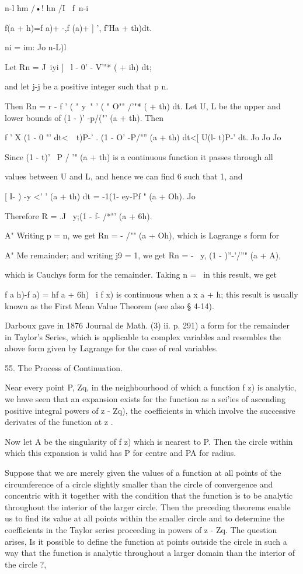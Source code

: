 {{n-l hm /•! hn /I \ f\ n-i

f(a + h)=f a)+ -,f (a)+ ] ', f'Ha + th)dt.

ni = im: Jo n-L)l

Let Rn = J~iyi ] \ l - 0' - V'"* ( + ih) dt;

and let j-j be a positive integer such that p n.

%
%

Then Rn = r - f ' ( " y~" ' ( " O"" /'"* ( + th) dt. Let U, L be the
upper and lower bounds of (1 - )' -p/("' (a + th). Then

f ' X (1 - 0 "' dt<\ \ t)P-' . (1 - O' -P/"'' (a + th) dt<[ U(l- t)P-'
dt. Jo Jo Jo

Since (1 - t)' ~P / '" (a + th) is a continuous function it passes
through all

values between U and L, and hence we can find 6 such that 1, and

[ I- ) -y <' ' (a + th) dt = -1(1- ey-Pf " (a + Oh). Jo

Therefore R = .J \ y;(1 - f- /*"' (a + 6h).

A" Writing p = n, we get Rn = - /"" (a + Oh), which is Lagrange s form
for

A" Me remainder; and writing j9 = 1, we get Rn = - \, y, (1 -
)''-'/''" (a + A),

which is Cauchys form for the remainder. Taking n = \ in this result,
we get

f a h)-f a) = hf a + 6h) \ i f x) is continuous when a x a + h; this
result is usually known as the First Mean Value Theorem (see also §
4-14).

Darboux gave in 1876 Journal de Math. (3) ii. p. 291) a form for the
remainder in Taylor's Series, which is applicable to complex variables
and resembles the above form given by Lagrange for the case of real
variables.

55. The Process of Continuation.

Near every point P, Zq, in the neighbourhood of which a function f z)
is analytic, we have seen that an expansion exists for the function as
a sei'ies of ascending positive integral powers of z - Zq), the
coefficients in which involve the successive derivates of the function
at z .

Now let A be the singularity of f z) which is nearest to P. Then the
circle within which this expansion is valid has P for centre and PA
for radius.

Suppose that we are merely given the values of a function at all
points of the circumference of a circle slightly smaller than the
circle of convergence and concentric with it together with the
condition that the function is to be analytic throughout the interior
of the larger circle. Then the preceding theorems enable us to find
its value at all points within the smaller circle and to determine the
coefficients in the Taylor series proceeding in powers of z - Zq. The
question arises, Is it possible to define the function at points
outside the circle in such a way that the function is analytic
throughout a larger domain than the interior of the circle ?,

}}
